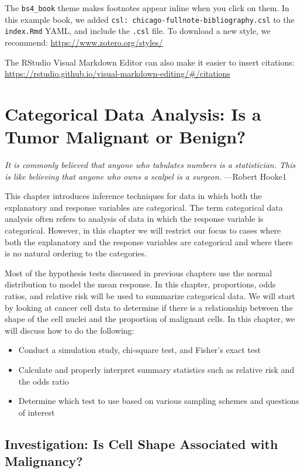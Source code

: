 \documentclass[
]{report}
\providecommand{\tightlist}{%
  \setlength{\itemsep}{0pt}\setlength{\parskip}{0pt}}
\begin{document}
The \texttt{bs4\_book} theme makes footnotes appear inline when you click on them. In this example book, we added \texttt{csl:\ chicago-fullnote-bibliography.csl} to the \texttt{index.Rmd} YAML, and include the \texttt{.csl} file. To download a new style, we recommend: \url{https://www.zotero.org/styles/}

The RStudio Visual Markdown Editor can also make it easier to insert citations: \url{https://rstudio.github.io/visual-markdown-editing/\#/citations}

\chapter{Categorical Data Analysis: Is a Tumor Malignant or Benign?}\label{categorical-data-analysis-is-a-tumor-malignant-or-benign}

\emph{It is commonly believed that anyone who tabulates numbers is a statistician. This is like believing that anyone who owns a scalpel is a surgeon.}
---Robert Hooke1

This chapter introduces inference techniques for data in which both the explanatory and
response variables are categorical. The term categorical data analysis often refers to
analysis of data in which the response variable is categorical. However, in this chapter
we will restrict our focus to cases where both the explanatory and the response variables are
categorical and where there is no natural ordering to the categories.

Most of the hypothesis tests discussed in previous chapters use the normal distribution to
model the mean response. In this chapter, proportions, odds ratios, and relative risk will be
used to summarize categorical data. We will start by looking at cancer cell data to determine
if there is a relationship between the shape of the cell nuclei and the proportion of malignant
cells. In this chapter, we will discuss how to do the following:

\begin{itemize}
\tightlist
\item
  Conduct a simulation study, chi-square test, and Fisher's exact test
\item
  Calculate and properly interpret summary statistics such as relative risk and the odds ratio
\item
  Determine which test to use based on various sampling schemes and questions of interest
\end{itemize}

\section{\texorpdfstring{\textbf{Investigation: Is Cell Shape Associated with Malignancy?}}{Investigation: Is Cell Shape Associated with Malignancy?}}\label{investigation-is-cell-shape-associated-with-malignancy}
\end{document}
